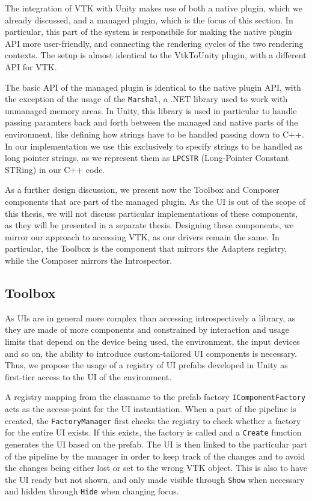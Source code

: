 The integration of VTK with Unity makes use of both a native plugin, which we already discussed, and a managed plugin, which is the focus of this section. In particular, this part of the system is responsibile for making the native plugin API more user-friendly, and connecting the rendering cycles of the two rendering contexts. The setup is almost identical to the VtkToUnity plugin, with a different API for VTK.

The basic API of the managed plugin is identical to the native plugin API, with the exception of the usage of the \verb|Marshal|, a .NET library used to work with unmanaged memory areas. In Unity, this library is used in particular to handle passing paramters back and forth between the managed and native parts of the environment, like defining how strings have to be handled passing down to C++. In our implementation we use this exclusively to specify strings to be handled as long pointer strings, as we represent them as \verb|LPCSTR| (Long-Pointer Constant STRing) in our C++ code.

As a further design discussion, we present now the Toolbox and Composer components that are part of the managed plugin. As the UI is out of the scope of this thesis, we will not discuss particular implementations of these components, as they will be presented in a separate thesis. Designing these components, we mirror our approach to accessing VTK, as our drivers remain the same. In particular, the Toolbox is the component that mirrors the Adapters registry, while the Composer mirrors the Introspector.

\subsection{Toolbox}
\label{sec:design-toolbox}

As UIs are in general more complex than accessing introspectively a library, as they are made of more components and constrained by interaction and usage limits that depend on the device being used, the environment, the input devices and so on, the ability to introduce custom-tailored UI components is necessary. Thus, we propose the usage of a registry of UI prefabs developed in Unity as first-tier access to the UI of the environment.

A registry mapping from the classname to the prefab factory \verb|IComponentFactory| acts as the access-point for the UI instantiation. When a part of the pipeline is created, the \verb|FactoryManager| first checks the registry to check whether a factory for the entire UI exists. If this exists, the factory is called and a \verb|Create| function generates the UI based on the prefab. The UI is then linked to the particular part of the pipeline by the manager in order to keep track of the changes and to avoid the changes being either lost or set to the wrong VTK object. This is also to have the UI ready but not shown, and only made visible through \verb|Show| when necessary and hidden through \verb|Hide| when changing focus.

